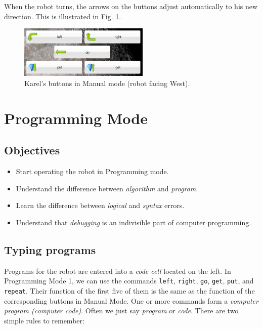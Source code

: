 When the robot turns, the arrows on the buttons adjust automatically to his new 
direction. This is illustrated in Fig. \ref{fig:buttons2}.

\begin{figure}[!ht]
\begin{center}
\includegraphics[width=6.2cm]{img/buttons-all-2.png}
\vspace{-0mm}
\caption{Karel's buttons in Manual mode (robot facing West).}
\label{fig:buttons2}
\end{center}
\end{figure}


\section{Programming Mode} \label{sec:bridge}

\subsection{Objectives} 
 
\begin{itemize}
\item Start operating the robot in Programming mode.
\item Understand the difference between {\em algorithm} and {\em program}. 
\item Learn the difference between {\em logical} and {\em syntax} errors.
\item Understand that {\em debugging} is an indivisible part of computer programming.
\end{itemize}

\subsection{Typing programs}

Programs for the robot are entered into a {\em code cell} located on the left.
In Programming Mode 1, we can use the commands {\tt left}, {\tt right}, {\tt go}, {\tt get}, 
{\tt put}, and {\tt repeat}.
Their function of the first five of them 
is the same as the function of the corresponding buttons in Manual Mode.
One or more commands form a {\em computer program (computer code)}. Often 
we just say {\em program} or {\em code}. There are two simple rules to remember:\\

